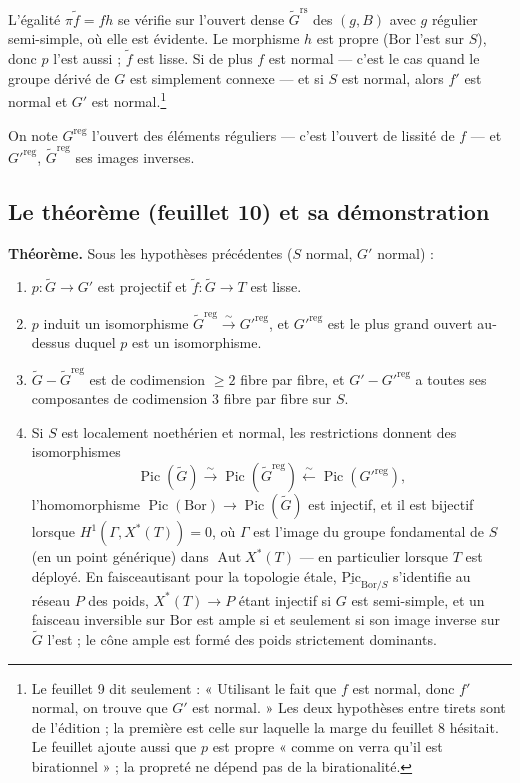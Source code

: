 \documentclass[11pt,a4paper]{article}
\begin{document}
L'égalité $\pi\tilde f=fh$ se vérifie sur l'ouvert dense
$\widetilde{G}^{\mathrm{rs}}$ des $(g,B)$ avec $g$ régulier semi-simple, où
elle est évidente. Le morphisme $h$ est propre ($\mathrm{Bor}$ l'est sur $S$),
donc $p$ l'est aussi ; $\tilde f$ est lisse. Si de plus $f$ est normal — c'est
le cas quand le groupe dérivé de $G$ est simplement connexe — et si $S$ est
normal, alors $f'$ est normal et $G'$ est normal.\footnote{Le feuillet 9 dit
seulement : « Utilisant le fait que $f$ est normal, donc $f'$ normal, on trouve
que $G'$ est normal. » Les deux hypothèses entre tirets sont de l'édition ; la
première est celle sur laquelle la marge du feuillet 8 hésitait. Le feuillet
ajoute aussi que $p$ est propre « comme on verra qu'il est birationnel » ; la
propreté ne dépend pas de la birationalité.}

On note $G^{\mathrm{reg}}$ l'ouvert des éléments réguliers — c'est l'ouvert de
lissité de $f$ — et $G'^{\mathrm{reg}}$, $\widetilde{G}^{\mathrm{reg}}$ ses
images inverses.

\subsection*{Le théorème (feuillet 10) et sa démonstration}

\textbf{Théorème.} Sous les hypothèses précédentes ($S$ normal, $G'$ normal) :

\begin{enumerate}
\item[(i)] $p\colon\widetilde{G}\to G'$ est projectif et
  $\tilde f\colon\widetilde{G}\to T$ est lisse.
\item[(ii)] $p$ induit un isomorphisme
  $\widetilde{G}^{\mathrm{reg}}\xrightarrow{\sim}G'^{\mathrm{reg}}$, et
  $G'^{\mathrm{reg}}$ est le plus grand ouvert au-dessus duquel $p$ est un
  isomorphisme.
\item[(iii)] $\widetilde{G}-\widetilde{G}^{\mathrm{reg}}$ est de codimension
  $\geqslant 2$ fibre par fibre, et $G'-G'^{\mathrm{reg}}$ a toutes ses
  composantes de codimension $3$ fibre par fibre sur $S$.
\item[(iv)] Si $S$ est localement noethérien et normal, les restrictions
  donnent des isomorphismes
  \[
    \operatorname{Pic}(\widetilde{G})\xrightarrow{\sim}
    \operatorname{Pic}(\widetilde{G}^{\mathrm{reg}})\xleftarrow{\sim}
    \operatorname{Pic}(G'^{\mathrm{reg}}),
  \]
  l'homomorphisme $\operatorname{Pic}(\mathrm{Bor})\to
  \operatorname{Pic}(\widetilde{G})$ est injectif, et il est bijectif lorsque
  $H^{1}(\Gamma,X^{*}(T))=0$, où $\Gamma$ est l'image du groupe fondamental de
  $S$ (en un point générique) dans $\operatorname{Aut}X^{*}(T)$ — en
  particulier lorsque $T$ est déployé. En faisceautisant pour la topologie
  étale, $\underline{\mathrm{Pic}}_{\mathrm{Bor}/S}$ s'identifie au réseau $P$
  des poids, $X^{*}(T)\to P$ étant injectif si $G$ est semi-simple, et un
  faisceau inversible sur $\mathrm{Bor}$ est ample si et seulement si son image
  inverse sur $\widetilde{G}$ l'est ; le cône ample est formé des poids
  strictement dominants.
\end{enumerate}
\end{document}
